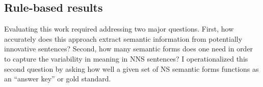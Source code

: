 %
%
%

\subsection{Rule-based results}
\label{sec:rule-results}

Evaluating this work required addressing two major questions.  First,
how accurately does this approach extract semantic information from potentially
innovative sentences?
Second, how many semantic forms does one need in order to capture the variability in meaning in NNS sentences? I operationalized this second question by asking how well a given set of NS semantic forms functions as an ``answer key'' or gold standard.

